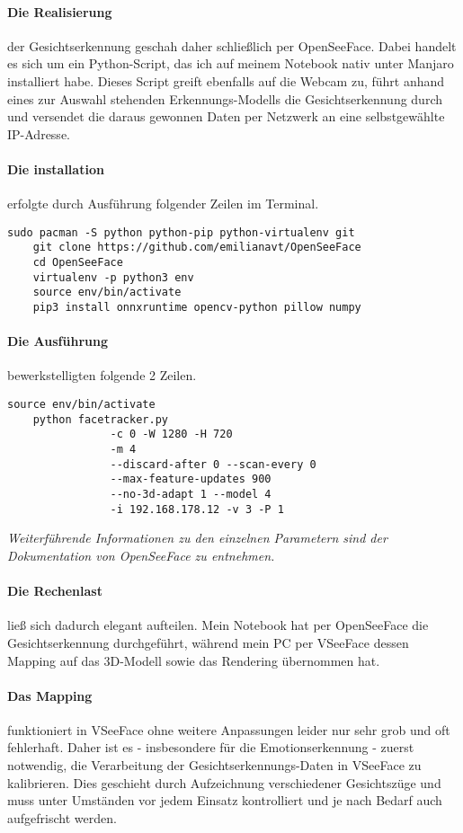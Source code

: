 \documentclass[a4paper, 12pt]{article}
\begin{document}
\paragraph{Die Realisierung} der Gesichtserkennung geschah daher schließlich per OpenSeeFace\cite{openseeface}.
Dabei handelt es sich um ein Python\cite{python}-Script,
das ich auf meinem Notebook nativ unter Manjaro\cite{manjaro} installiert habe\cite{tut-openseeface}.
Dieses Script greift ebenfalls auf die Webcam zu,
führt anhand eines zur Auswahl stehenden Erkennungs-Modells die Gesichtserkennung durch
und versendet die daraus gewonnen Daten per Netzwerk an eine selbstgewählte IP-Adresse.
\newpage
\paragraph{Die installation} erfolgte durch Ausführung folgender Zeilen im Terminal\cite{tut-openseeface}.
\begin{Verbatim}[fontsize=\small]
    sudo pacman -S python python-pip python-virtualenv git
    git clone https://github.com/emilianavt/OpenSeeFace
    cd OpenSeeFace
    virtualenv -p python3 env
    source env/bin/activate
    pip3 install onnxruntime opencv-python pillow numpy
\end{Verbatim}
\paragraph{Die Ausführung} bewerkstelligten folgende 2 Zeilen\cite{tut-openseeface}.
\begin{Verbatim}[fontsize=\small]
    source env/bin/activate
    python facetracker.py
                -c 0 -W 1280 -H 720
                -m 4
                --discard-after 0 --scan-every 0
                --max-feature-updates 900
                --no-3d-adapt 1 --model 4
                -i 192.168.178.12 -v 3 -P 1
\end{Verbatim}
\textit{Weiterführende Informationen zu den einzelnen Parametern sind der Dokumentation von OpenSeeFace\cite{openseeface} zu entnehmen.}
\paragraph{Die Rechenlast} ließ sich dadurch elegant aufteilen.
Mein Notebook hat per OpenSeeFace\cite{openseeface} die Gesichtserkennung durchgeführt,
während mein PC per VSeeFace\cite{vseeface} dessen Mapping auf das 3D-Modell sowie das Rendering übernommen hat.
\paragraph{Das Mapping} funktioniert in VSeeFace\cite{vseeface} ohne weitere Anpassungen
leider nur sehr grob und oft fehlerhaft.
Daher ist es - insbesondere für die Emotionserkennung - zuerst notwendig,
die Verarbeitung der Gesichtserkennungs-Daten in VSeeFace\cite{openseeface}
zu kalibrieren.
Dies geschieht durch Aufzeichnung verschiedener Gesichtszüge
und muss unter Umständen vor jedem Einsatz kontrolliert und je nach Bedarf auch aufgefrischt werden\cite{tut-expressions}.
\newpage
\end{document}
